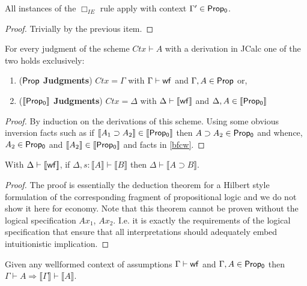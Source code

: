 \begin{lemma}
	All instances of the $\Box_{IE}$  rule apply with context $\Gamma^{\prime}\in {\sf Prop_0}$.
\end{lemma}
\begin{proof}
Trivially by the previous item.
\end{proof}
\begin{lemma}
\label{spjp}
For every judgment of the scheme $Ctx\vdash A$ with a derivation in JCalc one of the two holds exclusively:
\begin{enumerate}
\item (\textbf{${\sf Prop}$ Judgments}) $Ctx =\Gamma$  with $\Gamma\vdash {\sf wf}$ and $\Gamma,  A\in {\sf Prop}$
or, \item(\textbf{${\sf\llbracket  Prop_0\rrbracket}$ Judgments}) $Ctx=\Delta$ with $\Delta\vdash {\sf \llbracket wf\rrbracket}$ and $\Delta,  A \in \llbracket {\sf Prop_0}\rrbracket$
\end{enumerate}
\end{lemma}
\begin{proof}
By induction on the derivations of this scheme. Using some obvious inversion facts such as 
if $\llbracket   A_1\supset   A_2\rrbracket \in \llbracket{\sf Prop_0}\rrbracket$ then $  A\supset   A_2\in {\sf Prop_0}$
and whence, $  A_2 \in {\sf Prop_0}$ and $\llbracket   A_2 \rrbracket \in \llbracket {\sf Prop_0}\rrbracket$ and facts in \ref{bfcw}.
\end{proof}
\begin{theorem}
	\label{deduct}
With $\Delta\vdash \llbracket\sf wf\rrbracket$, if $\Delta, s:\llbracket   A\rrbracket \vdash\llbracket B \rrbracket $ then $\Delta \vdash\llbracket   A \supset B \rrbracket $. 
\end{theorem}
\begin{proof}
The proof is essentially the deduction theorem for a Hilbert style formulation of the corresponding fragment of  propositional logic and we do not show it here for economy. Note that this theorem cannot be proven without the logical specification {\sf $Ax_1$, $Ax_2$}. I.e. it is exactly the requirements of the logical specification that ensure that all  interpretations  should adequately embed intuitionistic implication.
\end{proof}
\begin{lemma}
\label{bracklift}
Given any wellformed context of assumptions $\Gamma \vdash {\sf wf}$ and $\Gamma,  A \in {\sf Prop_0}$ then $\Gamma\vdash   A \Longrightarrow \llbracket \Gamma\rrbracket \vdash \llbracket   A \rrbracket$. 
\end{lemma}

